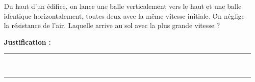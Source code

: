 Du haut d'un édifice, on lance une balle verticalement vers le haut et une balle identique horizontalement, toutes deux avec la même vitesse initiale. On néglige la résistance de l'air. Laquelle arrive au sol avec la plus grande vitesse ?

\choices

\noindent\textbf{Justification :} \hrulefill \\[2.5ex]
\rule{\linewidth}{0.4pt} \\[2.5ex]
\rule{\linewidth}{0.4pt}
\vfill
